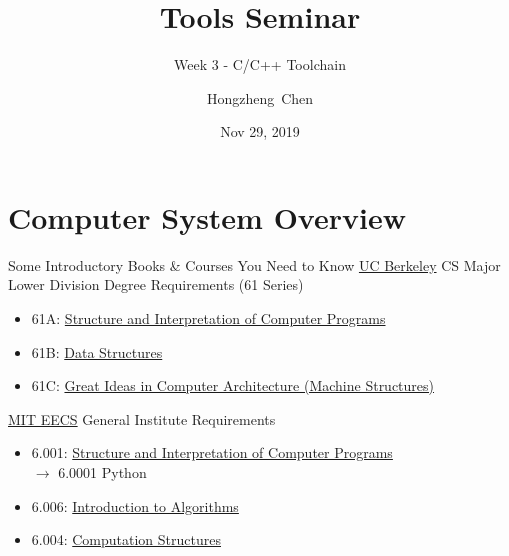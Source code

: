 \documentclass{../TexTemplate/myslide}
\title[ToolsSeminar]{Tools Seminar}
\subtitle{Week 3 - C/C++ Toolchain}
\author[chhzh123]{Hongzheng~Chen}
\date[Nov 29, 2019]{Nov 29, 2019}
\begin{document}
\begin{frame}
\titlepage
\end{frame}

\begin{frame}
\tableofcontents
\end{frame}

\section{Computer System Overview}
\begin{frame}
\sectionpage
\end{frame}

\begin{frame}{Some Introductory Books \& Courses You Need to Know}
\href{https://eecs.berkeley.edu/resources/undergrads/cs/degree-reqs-lowerdiv}{UC Berkeley} CS Major Lower Division Degree Requirements (61 Series)
\begin{itemize}
	\item 61A: \href{https://cs61a.org/}{Structure and Interpretation of Computer Programs}
	\item 61B: \href{https://inst.eecs.berkeley.edu/~cs61b/fa19/}{Data Structures}
	\item 61C: \href{https://cs61c.org/}{Great Ideas in Computer Architecture (Machine Structures)}
\end{itemize}
\href{http://catalog.mit.edu/degree-charts/computer-science-engineering-course-6-3/}{MIT EECS} General Institute Requirements
\begin{itemize}
	\item 6.001: \href{https://ocw.mit.edu/courses/electrical-engineering-and-computer-science/6-001-structure-and-interpretation-of-computer-programs-spring-2005/}{Structure and Interpretation of Computer Programs}\\\quad $\to$ 6.0001 Python
	\item 6.006: \href{https://courses.csail.mit.edu/6.006/fall11/notes.shtml}{Introduction to Algorithms}
	\item 6.004: \href{https://6004.mit.edu/web/fall19/}{Computation Structures}
\end{itemize}
\end{frame}
\end{document}
